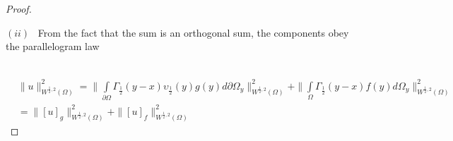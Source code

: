 \documentclass{amsart}%
\theoremstyle{plain}
\numberwithin{equation}{section}
\begin{document}
\begin{proof}
\ 

$\left(  ii\right)  $ \ From the fact that the sum is an orthogonal sum, the
components obey the parallelogram law

\
\begin{align*}
& \parallel u\parallel_{W^{\frac{1}{2},2}\left(  \Omega\right)  }%
^{2}=\parallel%
{\displaystyle\int\limits_{\partial\Omega}}
\Gamma_{\frac{1}{2}}\left(  y-x\right)  \upsilon_{\frac{1}{2}}\left(
y\right)  g(y)d\partial\Omega_{y}\parallel_{W^{\frac{1}{2},2}\left(
\Omega\right)  }^{2}+\parallel%
{\displaystyle\int\limits_{\Omega}}
\Gamma_{\frac{1}{2}}\left(  y-x\right)  f(y)d\Omega_{y}\parallel_{W^{\frac
{1}{2},2}\left(  \Omega\right)  }^{2}\\
& =\parallel\left[  u\right]  _{g}\parallel_{W^{\frac{1}{2},2}\left(
\Omega\right)  }^{2}+\parallel\left[  u\right]  _{f}\parallel_{W^{\frac{1}%
{2},2}\left(  \Omega\right)  }^{2}%
\end{align*}



\end{proof}
\end{document}

